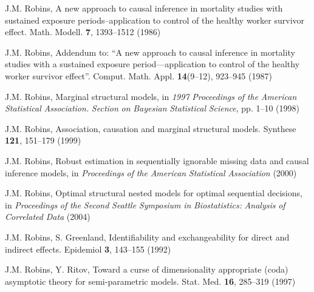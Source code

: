 \begin{list}{}{\setlength{\leftmargin}{2.1em}\setlength{\labelwidth}{0pt}
  \setlength{\labelsep}{0pt}\setlength{\itemindent}{-2.1em}
  \setlength{\parsep}{0pt}\setlength{\itemsep}{2pt}\setlength{\topsep}{0pt}}
\item\label{refentry:REF295}J.M. Robins, A new approach to causal inference in mortality studies with sustained exposure periods--application to control of the healthy worker survivor effect. Math. Modell. \textbf{7}, 1393--1512 (1986)\label{refend:REF295}
\item\label{refentry:REF296}J.M. Robins, Addendum to: ``A new approach to causal inference in mortality studies with a sustained exposure period---application to control of the healthy worker survivor effect''. Comput. Math. Appl. \textbf{14}(9--12), 923--945 (1987)\label{refend:REF296}
\item\label{refentry:REF297}J.M. Robins, Marginal structural models, in \textit{1997} \textit{Proceedings} \textit{of} \textit{the} \textit{American} \textit{Statistical} \textit{Association.} \textit{Section} \textit{on} \textit{Bayesian} \textit{Statistical} \textit{Science}, pp. 1--10 (1998)\label{refend:REF297}
\item\label{refentry:REF298}J.M. Robins, Association, causation and marginal structural models. Synthese \textbf{121}, 151--179 (1999)\label{refend:REF298}
\item\label{refentry:REF299}J.M. Robins, Robust estimation in sequentially ignorable missing data and causal inference models, in \textit{Proceedings} \textit{of} \textit{the} \textit{American} \textit{Statistical} \textit{Association} (2000)\label{refend:REF299}
\item\label{refentry:REF300}J.M. Robins, Optimal structural nested models for optimal sequential decisions, in \textit{Proceedings} \textit{of} \textit{the} \textit{Second} \textit{Seattle} \textit{Symposium} \textit{in} \textit{Biostatistics:} \textit{Analysis} \textit{of} \textit{Correlated} \textit{Data} (2004)\label{refend:REF300}
\item\label{refentry:REF301}J.M. Robins, S. Greenland, Identifiability and exchangeability for direct and indirect effects. Epidemiol \textbf{3}, 143--155 (1992)\label{refend:REF301}
\item\label{refentry:REF302}J.M. Robins, Y. Ritov, Toward a curse of dimensionality appropriate (coda) asymptotic theory for semi-parametric models. Stat. Med. \textbf{16}, 285--319 (1997)\label{refend:REF302}

\end{list}
